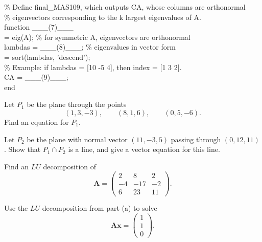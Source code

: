 \documentclass[11pt,oneside]{article}
\begin{document}
\begin{problem}
{\begin{tabbing}
\% Define final\_MAS109, which outputs CA, whose columns are orthonormal\\
\% eigenvectors corresponding to the k largest eigenvalues of A.\\
function \_\_\_(7)\_\_\_\\
\>[V, D] = eig(A); \% for symmetric A, eigenvectors are orthonormal\\
\>lambdas = \_\_\_(8)\_\_\_; \% eigenvalues in vector form\\
 = sort(lambdas, 'descend');\\
\>\% Example: if lambdas = [10 -5 4], then index = [1 3 2].\\
\>CA = \_\_\_(9)\_\_\_;\\
end
\end{tabbing}
}
\end{problem}

\begin{problem}
\begin{problemsubparts}
\item Let $P_1$ be the plane through the points
\[
(1,3,-3),\qquad(8,1,6),\qquad(0,5,-6).
\]
Find an equation for $P_1$.
\item Let $P_2$ be the plane with normal vector $(11,-3,5)$ passing through $(0,12,11)$. Show that $P_1\cap P_2$ is a line, and give a vector equation for this line.
\end{problemsubparts}
\end{problem}

\begin{problem}
\begin{problemsubparts}
\item Find an $LU$ decomposition of
\[
\mathbf A=
\begin{pmatrix}
2&8&2\\
-4&-17&-2\\
6&23&11
\end{pmatrix}.
\]
\item Use the $LU$ decomposition from part \textup{(a)} to solve
\[
\mathbf A\mathbf x=
\begin{pmatrix}
1\\1\\0
\end{pmatrix}.
\]
\end{problemsubparts}
\end{problem}
\end{document}
